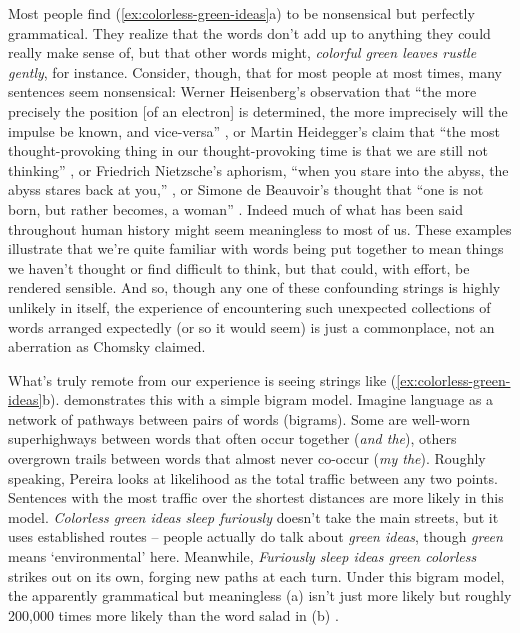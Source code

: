 Most people find (\ref{ex:colorless-green-ideas}a) to be nonsensical but perfectly grammatical. They realize that the words don't add up to anything they could really make sense of, but that other words might, \textit{colorful green leaves rustle gently}, for instance. Consider, though, that for most people at most times, many sentences seem nonsensical: Werner Heisenberg's observation that \enquote{the more precisely the position [of an electron] is determined, the more imprecisely will the impulse be known, and vice-versa} \citep[5]{Heisenberg1927}, or Martin Heidegger's claim that \enquote{the most thought-provoking thing in our thought-provoking time is that we are still not thinking} \citep{Heidegger1993}, or Friedrich Nietzsche's aphorism, \enquote{when you stare into the abyss, the abyss stares back at you,} \citep{NietzscheBeyondGoodAndEvil}, or Simone de Beauvoir's thought that \enquote{one is not born, but rather becomes, a woman} \citep{DeBeauvoir1949}. Indeed much of what has been said throughout human history might seem meaningless to most of us. These examples illustrate that we're quite familiar with words being put together to mean things we haven't thought or find difficult to think, but that could, with effort, be rendered sensible. And so, though any one of these confounding strings is highly unlikely in itself, the experience of encountering such unexpected collections of words arranged expectedly (or so it would seem) is just a commonplace, not an aberration as Chomsky claimed.

What's truly remote from our experience is seeing strings like (\ref{ex:colorless-green-ideas}b). \citet{Pereira2000} demonstrates this with a simple bigram model. Imagine language as a network of pathways between pairs of words (bigrams). Some are well-worn superhighways between words that often occur together (\textit{and the}), others overgrown trails between words that almost never co-occur (\textit{my the}). Roughly speaking, Pereira looks at likelihood as the total traffic between any two points. Sentences with the most traffic over the shortest distances are more likely in this model. \textit{Colorless green ideas sleep furiously} doesn't take the main streets, but it uses established routes -- people actually do talk about \textit{green ideas}, though \textit{green} means `environmental' here. Meanwhile, \textit{Furiously sleep ideas green colorless} strikes out on its own, forging new paths at each turn. %
Under this bigram model, the apparently grammatical but meaningless (a) isn't just more likely but roughly 200,000 times more likely than the word salad in (b) \citep[7]{Pereira2000}.

